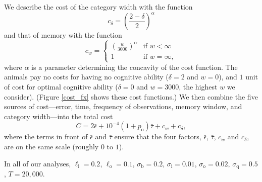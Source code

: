 We describe the cost of the category width with the function
\begin{equation*}
c_\delta = \left(\frac{2-\delta}{2}\right)^\alpha
\end{equation*}
and that of memory with the function
\begin{equation*}
c_w = \left\{\begin{array}{lll}\left(\frac{w}{3000}\right)^\alpha & \text{if } w<\infty
\\ 1 & \text{if } w=\infty, \end{array}\right.
\end{equation*}
where $\alpha$ is a parameter determining the concavity of the cost function. The animals pay no costs for having no cognitive ability ($\delta=2$ and $w=0$), and $1$ unit of cost for optimal cognitive ability ($\delta=0$ and $w=3000$, the highest $w$ we consider). (Figure \ref{cost_fx} shows these cost functions.)
We then combine the five sources of cost---error, time, frequency of observations, memory window, and category width---into the total cost 
\begin{equation*}
C = 2\bar{\epsilon}+10^{-4}(1+p_\text{o})\bar{\tau}+c_w+c_\delta,
\end{equation*}
where the terms in front of $\bar{\epsilon}$ and $\bar{\tau}$ ensure that the four factors, $\bar{\epsilon}$, $\bar{\tau}$, $c_w$ and $c_\delta$, are on the same scale (roughly $0$ to $1$). 

In all of our analyses, $\ell_\text{i}=0.2$, $\ell_\text{o}=0.1$, $\sigma_\text{b}=0.2$, $\sigma_\text{i}=0.01$, $\sigma_\text{o}=0.02$, $\sigma_\text{q}=0.5$, $T=20,000$.

